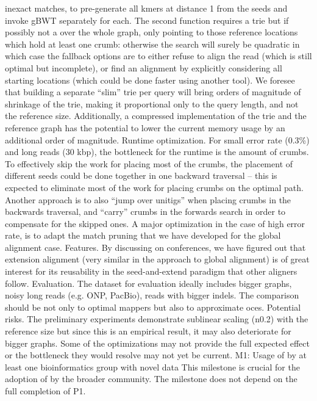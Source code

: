 inexact matches, to pre-generate all kmers at distance 1 from the seeds and
invoke gBWT separately for each. The second function requires a trie but if
possibly not a over the whole graph, only pointing to those reference locations
which hold at least one crumb: otherwise the \A search will surely be quadratic
in which case the fallback options are to either refuse to align the read (which
is still optimal but incomplete), or find an alignment by explicitly considering
all starting locations (which could be done faster using another tool). We
foresee that building a separate “slim” trie per query will bring orders of
magnitude of shrinkage of the trie, making it proportional only to the query
length, and not the reference size. Additionally, a compressed implementation of
the trie and the reference graph has the potential to lower the current memory
usage by an additional order of magnitude. Runtime optimization. For small error
rate (0.3\%) and long reads (30 kbp), the bottleneck for the runtime is the
amount of crumbs. To effectively skip the work for placing most of the crumbs,
the placement of different seeds could be done together in one backward
traversal – this is expected to eliminate most of the work for placing crumbs on
the optimal path.  Another approach is to also “jump over unitigs” when placing
crumbs in the backwards traversal, and “carry” crumbs in the forwards \A search
in order to compensate for the skipped ones. A major optimization in the case of
high error rate, is to adapt the match pruning that we have developed for the
global alignment case. Features. By discussing \astarix on conferences, we have
figured out that extension alignment (very similar in the approach to global
alignment) is of great interest for its reusability in the seed-and-extend
paradigm that other aligners follow. Evaluation. The dataset for evaluation
ideally includes bigger graphs, noisy long reads (e.g. ONP, PacBio), reads with
bigger indels. The comparison should be not only to optimal mappers but also to
approximate oces. Potential risks. The preliminary experiments demonstrate
sublinear scaling (n0.2) with the reference size but since this is an empirical
result, it may also deteriorate for bigger graphs. Some of the optimizations may
not provide the full expected effect or the bottleneck they would resolve may
not yet be current. M1: Usage of \astarix by at least one bioinformatics group
with novel data This milestone is crucial for the adoption of \astarix by the
broader community. The milestone does not depend on the full completion of P1.

